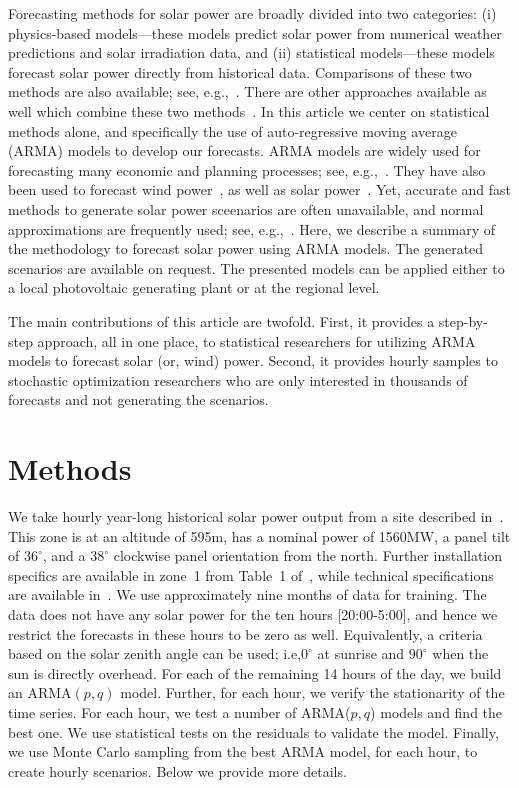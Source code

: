 \documentclass[review]{elsarticle}
\begin{document}
Forecasting methods for solar power are broadly divided 
into two categories: (i) physics-based models---these models predict solar power 
from numerical weather predictions and solar irradiation data, and (ii) statistical models---these 
models forecast 
solar power directly from historical data. Comparisons of these two 
methods are also available; see, 
e.g.,~\cite{huang2010comparative,inman2013solar}. There are other 
approaches available as well which combine these two 
methods~\cite{chen2011online}. 
In this article we center on  statistical  methods alone, and specifically the 
use of auto-regressive moving average (ARMA) 
models to develop our forecasts. ARMA models are widely used for forecasting 
many economic and planning processes; see, e.g.,~\cite{box2008time}. They 
 have also been used to forecast wind power~\cite{brown1984time, 
duran2007short}, as well as solar 
power~\cite{mora1998multiplicative,huang2012solar}.  Yet, accurate and 
fast methods to generate solar power sceenarios are often unavailable, and 
normal approximations are frequently used; see, e.g.,~\cite{su2014stochastic}. 
Here, 
we describe a summary of the methodology to forecast solar power using 
ARMA models. The generated scenarios are available on request.
The presented models can 
be applied either to a local photovoltaic generating plant or  at the regional 
level.

The main contributions of this article are twofold. First, it provides a 
step-by-step approach, all in one place, to statistical 
researchers for utilizing ARMA models to forecast solar (or, wind) power. 
Second, it provides hourly samples to stochastic optimization researchers who 
are only interested in thousands of forecasts and not generating the scenarios.

\section{Methods}
We take hourly year-long historical solar power output 
from a site described in~\cite{golestaneh2016generation}. 
This zone is at an altitude of 595m, has a nominal power of 1560MW, a panel tilt 
of $36^\circ$, and a $38^\circ$ clockwise panel orientation from the north. 
Further installation specifics are available in zone~1 from Table~1 
of~\cite{golestaneh2016generation}, while technical specifications are available 
in~\cite{technical}.  We use approximately nine months of data 
for training. The data does not have any solar power for the ten hours 
[20:00-5:00], and hence we restrict the forecasts in these hours to be zero as 
well. Equivalently, a criteria based on the solar zenith angle can be used; 
i.e,$0^\circ$ at sunrise and $90^\circ$ when the sun is directly overhead. For 
each of the remaining 14 hours of the day, we build an ARMA$(p,q)$ 
model. Further, for each hour, we verify the stationarity of the time 
series. For each hour, we test a number of ARMA($p,q$) models and find the best 
one. We use statistical tests on the residuals to validate the model. Finally, 
we use Monte Carlo sampling from the best ARMA model, for each hour, to create 
hourly scenarios. Below we provide more details.
\end{document}
